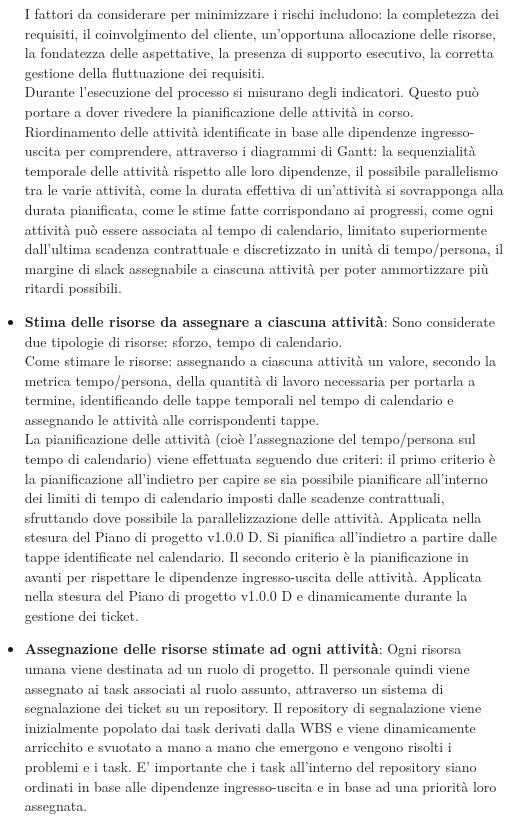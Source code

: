 \begin{itemize}
     I fattori da considerare per minimizzare i rischi includono: la completezza dei requisiti, il coinvolgimento del cliente, un'opportuna allocazione delle risorse, la fondatezza delle aspettative, la presenza di supporto esecutivo, la corretta gestione della fluttuazione dei requisiti.\\
     Durante l'esecuzione del processo si misurano degli indicatori. Questo può portare a dover rivedere la pianificazione delle attività in corso. \\
     Riordinamento delle attività identificate in base alle dipendenze ingresso-uscita per comprendere, attraverso i diagrammi di Gantt: la sequenzialità temporale delle attività rispetto alle loro dipendenze, il possibile parallelismo tra le varie attività, come la durata effettiva di un'attività si sovrapponga alla durata pianificata, come le stime fatte corrispondano ai progressi, come ogni attività può essere associata al tempo di calendario, limitato superiormente dall'ultima scadenza contrattuale e discretizzato in unità di tempo/persona, il margine di slack assegnabile a ciascuna attività per poter ammortizzare più ritardi possibili.
    \item \textbf{Stima delle risorse da assegnare a ciascuna attività}: Sono considerate due tipologie di risorse: sforzo, tempo di calendario. \\
     Come stimare le risorse: assegnando a ciascuna attività un valore, secondo la metrica tempo/persona, della quantità di lavoro necessaria per portarla a termine, identificando delle tappe temporali nel tempo di calendario e assegnando le attività alle corrispondenti tappe.\\
     La pianificazione delle attività (cioè l'assegnazione del tempo/persona sul tempo di calendario) viene effettuata seguendo due criteri: il primo criterio è la pianificazione all'indietro per capire se sia possibile pianificare all'interno dei limiti di tempo di calendario imposti dalle scadenze contrattuali, sfruttando dove possibile la parallelizzazione delle attività. Applicata nella stesura del Piano di progetto v1.0.0 D. Si pianifica all'indietro a partire dalle tappe identificate nel calendario. Il secondo criterio è la pianificazione in avanti per rispettare le dipendenze ingresso-uscita delle attività. Applicata nella stesura del Piano di progetto v1.0.0 D e dinamicamente durante la gestione dei ticket.
    \item \textbf{Assegnazione delle risorse stimate ad ogni attività}: Ogni risorsa umana viene destinata ad un ruolo di progetto. Il personale quindi viene assegnato ai task associati al ruolo assunto, attraverso un sistema di segnalazione dei ticket su un repository. Il repository di segnalazione viene inizialmente popolato dai task derivati dalla WBS e viene dinamicamente arricchito e svuotato a mano a mano che emergono e vengono risolti i problemi e i task. E' importante che i task all'interno del repository siano ordinati in base alle dipendenze ingresso-uscita e in base ad una priorità loro assegnata.
\end{itemize}

